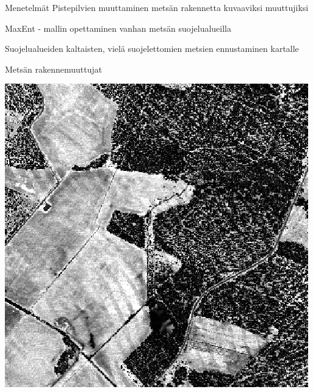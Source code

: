 \documentclass{beamer}
\begin{document}
\begin{frame}{Menetelmät}
  Pistepilvien muuttaminen metsän rakennetta kuvaaviksi muuttujiksi

  MaxEnt - mallin opettaminen vanhan metsän suojelualueilla

  Suojelualueiden kaltaisten, vielä suojelettomien metsien ennustaminen kartalle 
\end{frame}

\begin{frame}{Metsän rakennemuuttujat}
  \begin{center}
    \includegraphics[height=0.9\textheight]{intensity.png}
  \end{center}
\end{frame}
\end{document}
